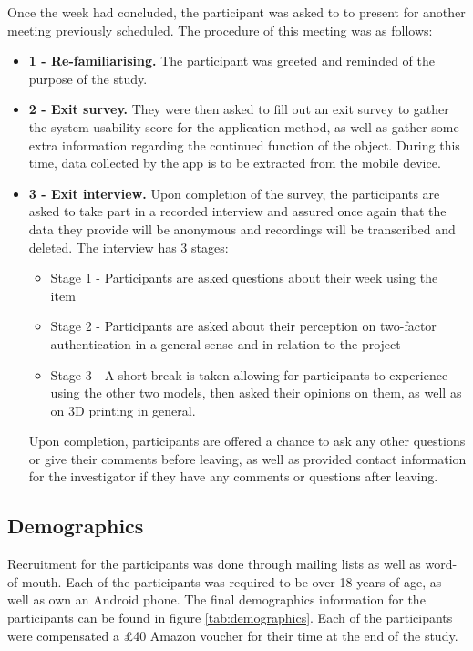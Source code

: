 \documentclass{l4proj}
\begin{document}
Once the week had concluded, the participant was asked to to present for another meeting previously scheduled. The procedure of this meeting was as follows:
\begin{itemize}
    \item \textbf{1 - Re-familiarising.} The participant was greeted and reminded of the purpose of the study.
    \item \textbf{2 - Exit survey.} They were then asked to fill out an exit survey to gather the system usability score for the application method, as well as gather some extra information regarding the continued function of the object. During this time, data collected by the app is to be extracted from the mobile device.
    \item \textbf{3 - Exit interview.} Upon completion of the survey, the participants are asked to take part in a recorded interview and assured once again that the data they provide will be anonymous and recordings will be transcribed and deleted. The interview has 3 stages:
    \begin{itemize}
        \item Stage 1 - Participants are asked questions about their week using the item
        \item Stage 2 - Participants are asked about their perception on two-factor authentication in a general sense and in relation to the project
        \item Stage 3 - A short break is taken allowing for participants to experience using the other two models, then asked their opinions on them, as well as on 3D printing in general.
    \end{itemize}
    Upon completion, participants are offered a chance to ask any other questions or give their comments before leaving, as well as provided contact information for the investigator if they have any comments or questions after leaving.
\end{itemize}


\subsection{Demographics}

Recruitment for the participants was done through mailing lists as well as word-of-mouth. Each of the participants was required to be over 18 years of age, as well as own an Android phone. The final demographics information for the participants can be found in figure \ref{tab:demographics}. Each of the participants were compensated a £40 Amazon voucher for their time at the end of the study.
\end{document}
